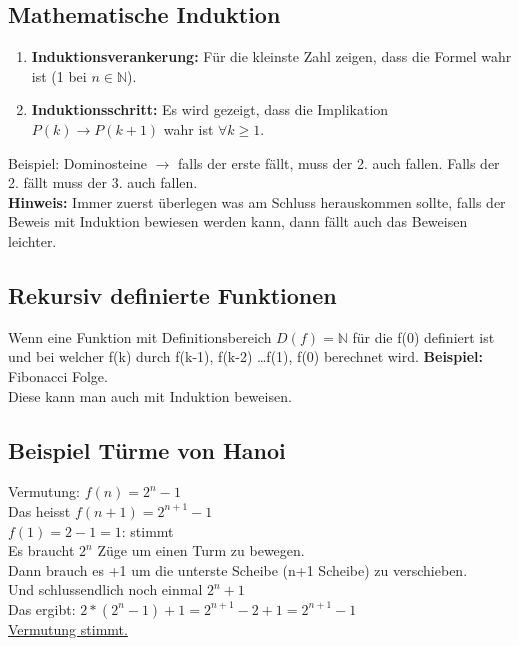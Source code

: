 \documentclass[12pt]{scrartcl}
\begin{document}
\subsection{Mathematische Induktion}

\begin{enumerate}
    \item \textbf{Induktionsverankerung:} Für die kleinste Zahl zeigen, dass die Formel wahr ist (1 bei $n \in \mathbb{N}$).
    \item \textbf{Induktionsschritt:} Es wird gezeigt, dass die Implikation $P(k) \rightarrow P(k+1)$ wahr ist $\forall k \geq 1$.
\end{enumerate}

Beispiel: Dominosteine $\rightarrow$ falls der erste fällt, muss der 2. auch fallen. Falls der 2.
fällt muss der 3. auch fallen.\\

\textbf{Hinweis:} Immer zuerst überlegen was am Schluss herauskommen sollte, falls der Beweis mit Induktion
bewiesen werden kann, dann fällt auch das Beweisen leichter.


\subsection{Rekursiv definierte Funktionen}
Wenn eine Funktion mit Definitionsbereich $D(f) = \mathbb{N}$ für die f(0) definiert ist und
bei welcher f(k) durch f(k-1), f(k-2) \dots f(1), f(0) berechnet wird.
\textbf{Beispiel:} Fibonacci Folge.\\

Diese kann man auch mit Induktion beweisen.


\subsection{Beispiel Türme von Hanoi}
Vermutung: $f(n) = 2^n - 1$\\
Das heisst $f(n+1) = 2^{n+1} - 1$\\


$f(1) = 2 - 1 = 1$: stimmt\\
Es braucht $2^n$ Züge um einen Turm zu bewegen.\\
Dann brauch es +1 um die unterste Scheibe (n+1 Scheibe) zu verschieben.\\
Und schlussendlich noch einmal $2^n + 1$\\
Das ergibt: $2* (2^n-1) + 1 = 2^{n+1} - 2 + 1 = 2^{n+1} - 1$ \\
\underline{Vermutung stimmt.}
\end{document}
